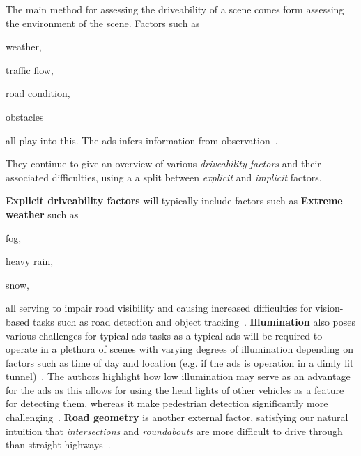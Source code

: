 The main method for assessing the driveability of a scene comes form assessing the environment of
the scene. Factors such as \begin{inparaenum}
    \item weather,
    \item traffic flow,
    \item road condition,
    \item obstacles \end{inparaenum} all play into this. The \acrshort{ads} infers information from
observation~\cite[3136]{safeToDrive}.

They continue to give an overview of various \textit{driveability factors} and their associated
difficulties, using a a split between \textit{explicit} and \textit{implicit} factors.

\textbf{Explicit driveability factors} will typically include factors such as \textbf{Extreme
    weather} such as \begin{inparaenum}
    \item fog,
    \item heavy rain,
    \item snow,
\end{inparaenum}
all serving to impair road visibility and causing increased difficulties for vision-based tasks such
as road detection and object tracking~\cite[3136-3137]{safeToDrive}. \textbf{Illumination} also
poses various challenges for typical \acrshort{ads} tasks as a typical \acrshort{ads} will be
required to operate in a plethora of scenes with varying degrees of illumination depending on
factors such as time of day and location (e.g. if the \acrshort{ads} is operation in a dimly lit
tunnel)~\cite[3137]{safeToDrive}. The authors highlight how low illumination may serve as an
advantage for the \acrshort{ads} as this allows for using the head lights of other vehicles as a
feature for detecting them, whereas it make pedestrian detection significantly more
challenging~\cite[3137]{safeToDrive}. \textbf{Road geometry} is another external factor, satisfying
our natural intuition that \textit{intersections} and \textit{roundabouts} are more difficult to
drive through than straight highways~\cite[3137]{safeToDrive}.

